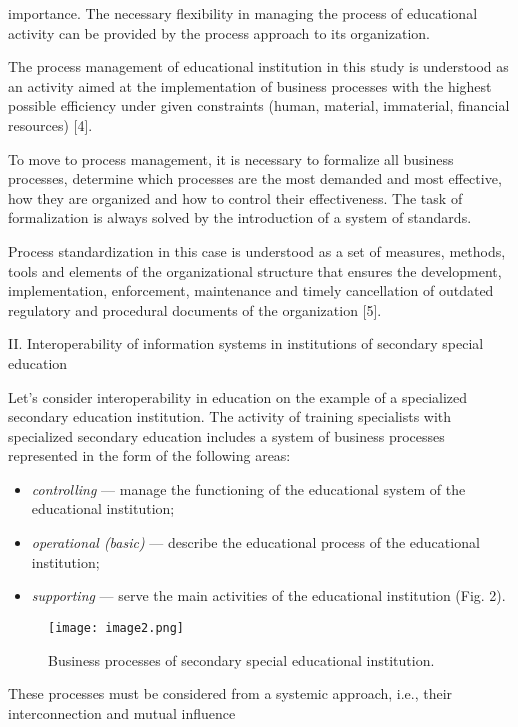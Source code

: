 \documentclass[10pt, a4paper]{article}
\begin{document}
\begin{multicols}{2}
importance. The necessary flexibility in managing the
process of educational activity can be provided by the
process approach to its organization.
\par
The process management of educational institution in
this study is understood as an activity aimed at the
implementation of business processes with the highest
possible efficiency under given constraints (human, material, immaterial, financial resources) [4].
\par
To move to process management, it is necessary to formalize all business processes, determine which processes
are the most demanded and most effective, how they are
organized and how to control their effectiveness. The task
of formalization is always solved by the introduction of
a system of standards.
\par
Process standardization in this case is understood as
a set of measures, methods, tools and elements of the
organizational structure that ensures the development,
implementation, enforcement, maintenance and timely
cancellation of outdated regulatory and procedural documents of the organization [5].
\begin{center}
  II. Interoperability of information systems in
institutions of secondary special education
\end{center}
\par
Let’s consider interoperability in education on the
example of a specialized secondary education institution.
The activity of training specialists with specialized secondary education includes a system of business processes
represented in the form of the following areas:
\begin{itemize}
  \item \textit{controlling} — manage the functioning of the educational system of the educational institution;
  \item \textit{operational (basic)} — describe the educational process of the educational institution;
  \item \textit{supporting} — serve the main activities of the educational institution (Fig. 2).
\end{itemize}
\begin{figure}[H]
  \texttt{[image: image2.png]}
  \caption{Business processes of secondary special educational institution.}
\end{figure}
\par
These processes must be considered from a systemic
approach, i.e., their interconnection and mutual influence

\end{multicols}
\end{document}
